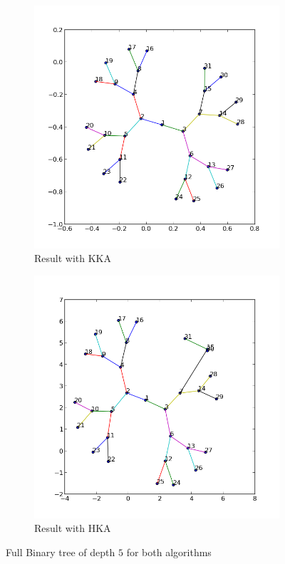 \documentclass[12pt,a4paper]{article}
\begin{document}
\begin{figure}[t]
	 \begin{subfigure}{0.5\textwidth}
		   \centering
           \includegraphics[scale=0.4]{results_Kawai/binary5kk}
           \caption{Result with KKA}
     \end{subfigure}
	 \begin{subfigure}{0.5\textwidth}
			\centering
           \includegraphics[scale=0.4]{results_Kawai/binary5hk}
            \caption{Result with HKA}
     \end{subfigure}
     \caption{Full Binary tree of depth $5$ for both algorithms }
     \label{fig: bincomp}
\end{figure}  
\end{document}
